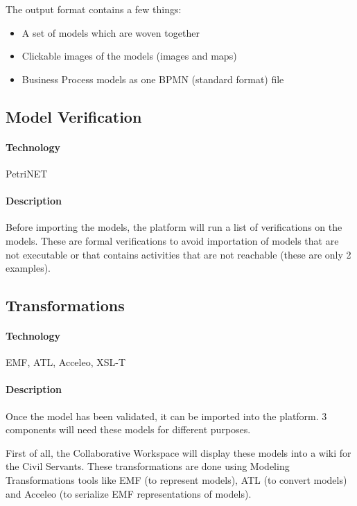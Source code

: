 \documentclass{learnpad}
\begin{document}
The output format contains a few things:
\begin{itemize}
	\item A set of models which are woven together
	\item Clickable images of the models (images and maps)
	\item Business Process models as one BPMN (standard format) file
\end{itemize}

\subsection{Model Verification}
\label{sec:model-verification}

\paragraph{Technology}
PetriNET

\paragraph{Description}
Before importing the models, the \learnpad platform will run a list of
verifications on the models.  These are formal verifications to avoid
importation of models that are not executable or that contains activities that
are not reachable (these are only 2 examples).

\subsection{Transformations}
\label{sec:transformations}

\paragraph{Technology}
EMF, ATL, Acceleo, XSL-T

\paragraph{Description}
Once the model has been validated, it can be imported into the \learnpad
platform.  3 components will need these models for different purposes.

First of all, the Collaborative Workspace will display these models into a wiki
for the Civil Servants.  These transformations are done using Modeling
Transformations tools like EMF (to represent models), ATL (to convert models)
and Acceleo (to serialize EMF representations of models).
\end{document}
